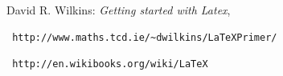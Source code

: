 \documentclass[12pt,a4paper]{amsart}
\numberwithin{equation}{section}
\theoremstyle{plain}
\theoremstyle{definition}
\begin{document}
\begin{thebibliography}{99} 

 David R. Wilkins: \textit{Getting started with Latex}, \begin{verbatim} http://www.maths.tcd.ie/~dwilkins/LaTeXPrimer/
\end{verbatim}

 \begin{verbatim} http://en.wikibooks.org/wiki/LaTeX \end{verbatim}



\end{thebibliography}
\end{document}
